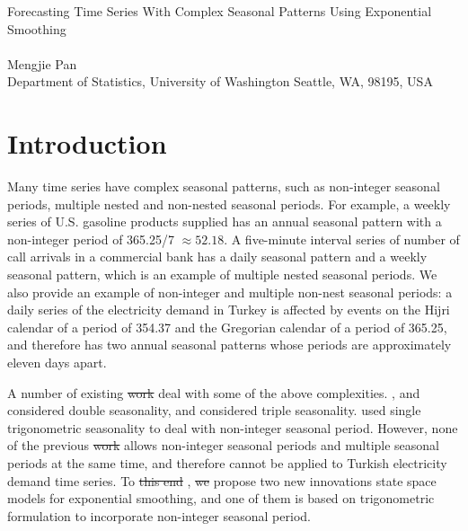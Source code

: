 \documentclass{uwstat572}
\newcommand{\vmdel}[1]{\sout{#1}}
\newcommand{\vmadd}[1]{\textbf{\color{red}{#1}}}
\begin{document}



\begin{center}
  {\LARGE Forecasting Time Series With Complex Seasonal Patterns Using Exponential Smoothing}\\\ \\
  {Mengjie Pan \\ 
    Department of Statistics, University of Washington Seattle, WA, 98195, USA
  }
\end{center}




\section{Introduction}

\hspace{4ex}Many time series have complex seasonal patterns, such as non-integer seasonal periods, multiple nested and non-nested seasonal periods. For example, a weekly series of U.S. gasoline products supplied has an annual seasonal pattern with a non-integer period of 365.25/7 $\approx 52.18$. A five-minute interval series of number of call arrivals in a commercial bank has a daily seasonal pattern and a weekly seasonal pattern, which is an example of multiple nested seasonal periods. We also provide an example of non-integer and multiple non-nest seasonal periods: a daily series of the electricity demand in Turkey is affected by events on the Hijri calendar of a period of 354.37 and the Gregorian calendar of a period of 365.25, and therefore has two annual seasonal patterns whose periods are approximately eleven days apart. 

A number of existing \vmdel{work} \vmadd{approaches} deal with some of the above complexities. \citet{pedregal2006modulated}, \citet{harvey1993forecasting} and \citet{taylor2003short} considered double seasonality, and \citet{taylor2010triple} considered triple seasonality. \citet{harvey1997modeling} used single trigonometric seasonality to deal with non-integer seasonal period. However, none of the previous \vmdel{work} \vmadd{methods} allows \vmadd{for} non-integer seasonal periods and multiple seasonal periods at the same time, and therefore cannot be applied to Turkish electricity demand time series. To \vmdel{this end} \vmadd{remedy this shortcoming}, \vmadd{\citet{de2011forecasting}} \vmdel{we} propose two new innovations state space models for exponential smoothing, and one of them is based on trigonometric formulation to incorporate non-integer seasonal period. 
\end{document}
